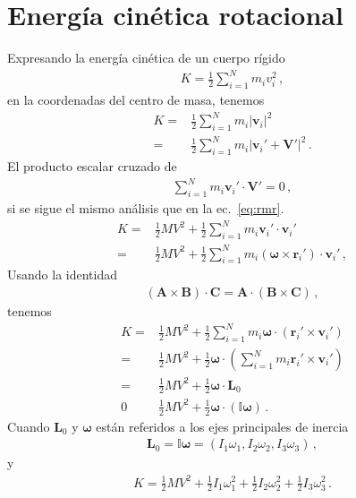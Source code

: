 \section{Energía cinética rotacional}
Expresando la energía cinética de un cuerpo rígido 
\begin{align}
  K=\frac{1}{2}\sum_{i=1}^N m_i v_i^2\,,
\end{align}
en la coordenadas del centro de masa, tenemos
\begin{align}
  K=&\frac{1}{2}\sum_{i=1}^N m_i |\mathbf{v}_i|^2\nonumber\\
  =&\frac{1}{2}\sum_{i=1}^N m_i |\mathbf{v}_i'+\mathbf{V}'|^2\,.
\end{align}
El producto escalar cruzado de
\begin{align*}
  \sum_{i=1}^N m_i \mathbf{v}_i'\cdot\mathbf{V}'=0\,,
\end{align*}
si se sigue el mismo análisis que en la ec.~\eqref{eq:rmr}.
\begin{align*}
 K =&\frac{1}{2}M V^2+\frac{1}{2}\sum_{i=1}^N m_i \mathbf{v}_i'\cdot\mathbf{v}_i'\nonumber\\
 =&\frac{1}{2}M V^2+\frac{1}{2}\sum_{i=1}^N m_i (\boldsymbol{\omega}\times \mathbf{r}_i')\cdot\mathbf{v}_i'\,,
\end{align*}
Usando la identidad
\begin{align}
  (\mathbf{A}\times\mathbf{B})\cdot \mathbf{C}=\mathbf{A}\cdot(\mathbf{B}\times\mathbf{C})\,,
\end{align}
tenemos
\begin{align}
K =&\frac{1}{2}M V^2+\frac{1}{2}\sum_{i=1}^N m_i \boldsymbol{\omega}\cdot( \mathbf{r}_i'\times\mathbf{v}_i')\nonumber\\
=&\frac{1}{2}M V^2+\frac{1}{2}\boldsymbol{\omega}\cdot
\left(\sum_{i=1}^N m_i  \mathbf{r}_i'\times\mathbf{v}_i'\right)\nonumber\\
    =&\frac{1}{2}M V^2+\frac{1}{2}\boldsymbol{\omega}\cdot
  \mathbf{L}_0\nonumber\\
0&\frac{1}{2}M V^2+\frac{1}{2}\boldsymbol{\omega}\cdot
  \left(\mathbb{I}\boldsymbol{\omega}\right)\,.
\end{align}
Cuando $\mathbf{L}_0$ y $\boldsymbol{\omega}$ están referidos a los ejes principales de inercia
\begin{align}
  \mathbf{L}_0=\mathbb{I}\boldsymbol{\omega}=  \left(I_1\omega_1,I_2\omega_2,I_3\omega_3  \right)\,,
\end{align}
y
\begin{align}
  K=\frac{1}{2}MV^2+\frac{1}{2}I_1\omega_1^2+\frac{1}{2}I_2\omega_2^2+\frac{1}{2}I_3\omega_3^2\,.
\end{align}

